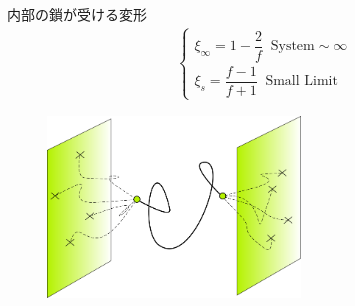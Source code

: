 \documentclass[11pt, dvipdfmx]{beamer}
\begin{document}
\begin{frame}
\begin{columns}[totalwidth=1\textwidth]
\begin{exampleblock}{内部の鎖が受ける変形}
\begin{align*}
&\begin{cases}
\xi_{\infty} = 1-\dfrac{2}{f} \;\; \text{System}\sim \infty \\[8pt]
\xi_{s} = \dfrac{f-1}{f+1} \;\; \text{Small Limit}
\end{cases}
\end{align*}
\vspace{-7mm}
\begin{figure}
\centering
\includegraphics[width=0.6\textwidth]{./fig/phantom.png}
\end{figure}
\end{exampleblock}
\end{columns}
\end{frame}

\end{document}

